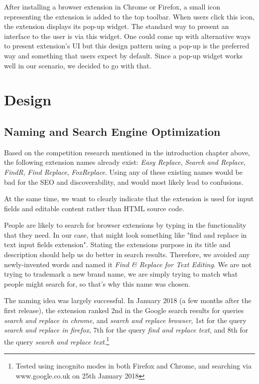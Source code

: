 \documentclass[bsc,frontabs,twoside,singlespacing,parskip,deptreport]{infthesis}
\begin{document}
After installing a browser extension in Chrome or Firefox, a small icon representing the extension is added to the top toolbar. When users click this icon, the extension displays its pop-up widget. The standard way to present an interface to the user is via this widget. One could come up with alternative ways to present extension's UI but this design pattern using a pop-up is the preferred way and something that users expect by default. Since a pop-up widget works well in our scenario, we decided to go with that.

\chapter{Design}

\section{Naming and Search Engine Optimization}
Based on the competition research mentioned in the introduction chapter above, the following extension names already exist: \textit{Easy Replace}, \textit{Search and Replace}, \textit{FindR}, \textit{Find Replace}, \textit{FoxReplace}. Using any of these existing names would be bad for the SEO and discoverability, and would most likely lead to confusions.

At the same time, we want to clearly indicate that the extension is used for input fields and editable content rather than HTML source code.

People are likely to search for browser extensions by typing in the functionality that they need. In our case, that might look something like "find and replace in text input fields extension". Stating the extensions purpose in its title and description should help us do better in search results. Therefore, we avoided any newly-invented words and named it \textit{Find \& Replace for Text Editing}. We are not trying to trademark a new brand name, we are simply trying to match what people might search for, so that's why this name was chosen.

The naming idea was largely successful. In January 2018 (a few months after the first release), the extension ranked 2nd in the Google search results for queries \textit{search and replace in chrome}, and \textit{search and replace browser}, 1st for the query \textit{search and replace in firefox}, 7th for the query \textit{find and replace text}, and 8th for the query \textit{search and replace text}.\footnote{Tested using incognito modes in both Firefox and Chrome, and searching via www.google.co.uk on 25th January 2018}
\end{document}
